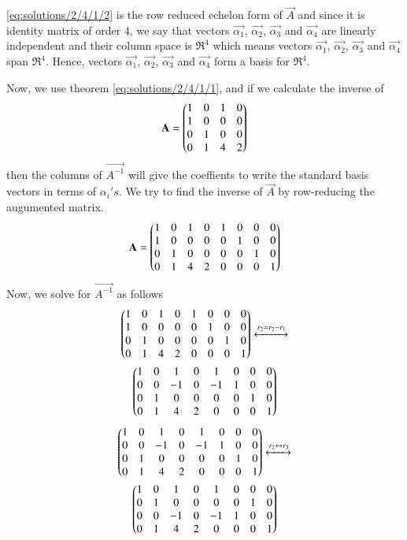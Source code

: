 \eqref{eq:solutions/2/4/1/2} is the row reduced echelon form of $\vec{A}$ and since it is identity matrix of order 4, we say that vectors $\vec{\alpha_1}$, $\vec{\alpha_2}$, $\vec{\alpha_3}$ and $\vec{\alpha_4}$ are linearly independent and their column space is $\Re^4$ which means vectors $\vec{\alpha_1}$, $\vec{\alpha_2}$, $\vec{\alpha_3}$ and $\vec{\alpha_4}$ span $\Re^4$.
Hence, vectors $\vec{\alpha_1}$, $\vec{\alpha_2}$, $\vec{\alpha_3}$ and $\vec{\alpha_4}$ form a basis for $\Re^4$. 

Now, we use theorem \eqref{eq:solutions/2/4/1/1}, and if we calculate the inverse of 
\begin{align}
	\mathbf{A} = \begin{pmatrix}1 & 0 & 1 & 0 \\ 1 & 0 & 0 & 0 \\ 0 & 1 & 0 & 0 \\ 0 & 1 & 4 & 2\end{pmatrix}
\end{align}
then the columns of $\vec{A^{-1}}$ will give the coeffients to write the standard basis vectors in terms of $\alpha_i's$. We try to find the inverse of $\vec{A}$ by row-reducing the augumented matrix. 
\begin{align}
	\mathbf{A} = \begin{pmatrix}1 & 0 & 1 & 0& 1 &0 &0 & 0 \\ 1 & 0 & 0 & 0& 0&1 &0&0 \\ 0 & 1 & 0 & 0& 0 &0 &1 &0 \\ 0 & 1 & 4 & 2& 0 & 0& 0 &1\end{pmatrix}
\end{align}
Now, we solve for $\vec{A^{-1}}$ as follows 
\begin{multline}
 \begin{pmatrix}1 & 0 & 1 & 0& 1 &0 &0 & 0 \\ 1 & 0 & 0 & 0& 0&1 &0&0 \\ 0 & 1 & 0 & 0& 0 &0 &1 &0 \\ 0 & 1 & 4 & 2& 0 & 0& 0 &1\end{pmatrix} \xleftrightarrow[]{r_2=r_2-r_1} \\ \begin{pmatrix}1 & 0 & 1 & 0& 1 &0 &0 & 0 \\ 0 & 0 & -1 & 0& -1&1 &0&0 \\ 0 & 1 & 0 & 0& 0 &0 &1 &0 \\ 0 & 1 & 4 & 2& 0 & 0& 0 &1\end{pmatrix}
\end{multline}
\begin{multline}
\begin{pmatrix}1 & 0 & 1 & 0& 1 &0 &0 & 0 \\ 0 & 0 & -1 & 0& -1&1 &0&0 \\ 0 & 1 & 0 & 0& 0 &0 &1 &0 \\ 0 & 1 & 4 & 2& 0 & 0& 0 &1\end{pmatrix}\xleftrightarrow[]{r_2 \leftrightarrow r_3} \\ \begin{pmatrix}1 & 0 & 1 & 0& 1 &0 &0 & 0 \\0 & 1 & 0 & 0& 0 &0 &1 &0 \\ 0 & 0 & -1 & 0& -1&1 &0&0  \\ 0 & 1 & 4 & 2& 0 & 0& 0 &1\end{pmatrix}
\end{multline}
